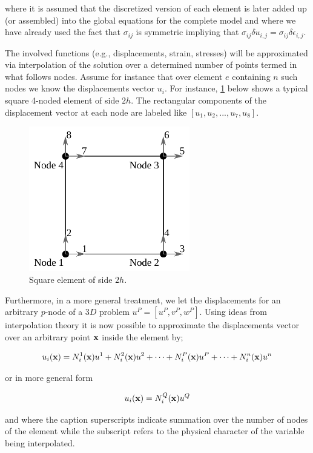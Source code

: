 where it is assumed that the discretized version of each element is later added up (or assembled) into the global equations for the complete model and where we have already used the fact that $\sigma_{ij}$ is symmetric impliying that $\sigma_{ij} \delta u_{i,j} = \sigma_{ij} \delta\epsilon_{i,j}$.

The involved functions (e.g., displacements, strain, stresses) will be approximated via interpolation of the solution over a determined number of points termed in what follows nodes. Assume for instance that over element $e$ containing $n$ such nodes we know the displacements vector $u_i$. For instance, \cref{fig:simple element} below shows a typical square 4-noded element of side $2h$. The rectangular components of the displacement vector at each node are labeled like $[u_1, u_2,...,u_7, u_8]$.

\begin{figure}[H]
\centering
\includegraphics[width=7cm]{lado2h.pdf}
\caption{Square element of side $2h$.}
\label{fig:simple element}
\end{figure}


Furthermore, in a more general treatment, we let the displacements for an arbitrary $p$-node of a $3D$ problem $u^P=[u^P, v^P, w^P]$. Using ideas from interpolation theory it is now possible to approximate the displacements vector over an arbitrary point $\vb{x}$ inside the element by;

\[u_i(\vb x) = N_i^1(\vb x)u^1 + N_i^2(\vb x)u^2 + \cdots + N_i^P(\vb x)u^P + \cdots + N_i^n(\vb x)u^n\]

or in more general form

\begin{equation} \label{bas_interpol}
{u_i}(\vb x) = N_i^Q(\vb x){u^Q}
\end{equation}

and where the caption superscripts indicate summation over the number of nodes of the element while the subscript refers to the physical character of the variable being interpolated.

